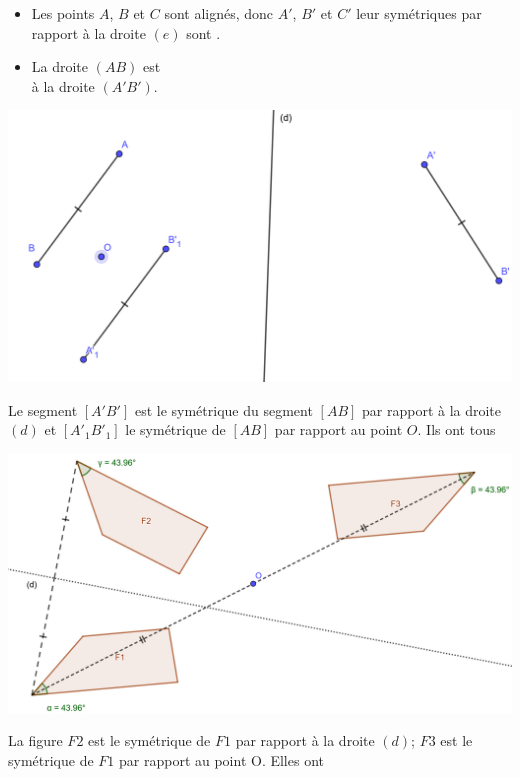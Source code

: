 \documentclass[12pt,a4paper]{article}
\begin{document}
\begin{myexs}
\begin{multicols}{2}
		\begin{itemize}
			\item Les points $A$, $B$ et $C$ sont alignés, donc $A'$, $B'$ et $C'$ leur symétriques par rapport à la droite $(e)$ sont \hspace*{6cm}.
			\item La droite $(AB)$ est \hspace*{4cm} \\ à la droite $(A'B')$.
		\end{itemize}
	\end{multicols}
\end{myexs}

\begin{myex}
	\begin{center}
		\includegraphics[scale=0.2]{sym_seg}
	\end{center}
	
	Le segment $[A'B']$ est le symétrique du segment $[AB]$ par rapport à la droite $(d)$ et $[A'_1B'_1]$ le symétrique de $[AB]$ par rapport au point $O$. 
	Ils ont tous \\
	
	
\end{myex}

\begin{myex}
	\begin{center}
		\includegraphics[scale=0.2]{sym_figures}
	\end{center}
	
	La figure $F2$ est le symétrique de $F1$ par rapport à la droite $(d)$; $F3$ est le symétrique de $F1$ par rapport au point O.
	Elles ont \\
\end{myex}
\end{document}
